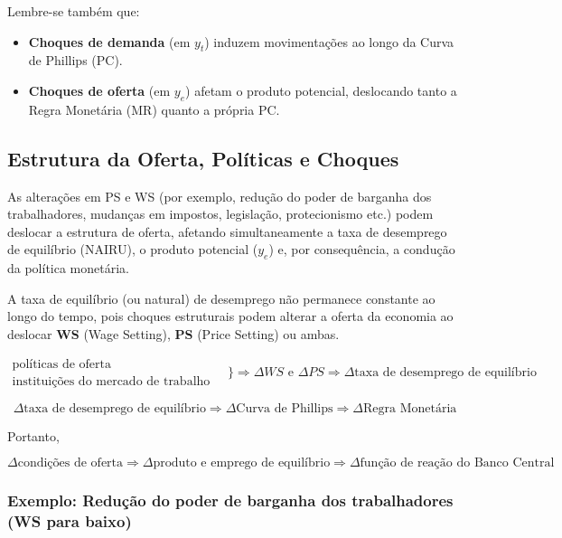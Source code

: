 \documentclass[a4paper,12pt]{article}[abntex2]
\begin{document}
Lembre-se também que:
\begin{itemize}
    \item \textbf{Choques de demanda} (em $y_t$) induzem movimentações ao longo da Curva de Phillips (PC).
    \item \textbf{Choques de oferta} (em $y_e$) afetam o produto potencial, deslocando tanto a Regra Monetária (MR) quanto a própria PC.
\end{itemize}

\subsection{\textbf{Estrutura da Oferta, Políticas e Choques}}

As alterações em PS e WS (por exemplo, redução do poder de barganha dos trabalhadores, mudanças em impostos, legislação, protecionismo etc.) podem deslocar a estrutura de oferta, afetando simultaneamente a taxa de desemprego de equilíbrio (NAIRU), o produto potencial ($y_e$) e, por consequência, a condução da política monetária.

A taxa de equilíbrio (ou natural) de desemprego não permanece constante ao longo do tempo, pois choques estruturais podem alterar a oferta da economia ao deslocar \textbf{WS} (Wage Setting), \textbf{PS} (Price Setting) ou ambas.

\[
\begin{array}{c}
\text{políticas de oferta} \\
\text{instituições do mercado de trabalho}
\end{array}
\quad
\Bigg\} 
 \Longrightarrow 
\Delta WS \text{ e } \Delta PS
 \Longrightarrow 
\Delta \text{taxa de desemprego de equilíbrio}
\]

\[
\Delta \text{taxa de desemprego de equilíbrio} 
\Longrightarrow
\Delta \text{Curva de Phillips} 
\Longrightarrow 
\Delta \text{Regra Monetária}
\]

Portanto,

\[
\Delta \text{condições de oferta} 
 \Longrightarrow 
\Delta \text{produto e emprego de equilíbrio} 
 \Longrightarrow 
\Delta \text{função de reação do Banco Central}
\]

\subsubsection{\textbf{Exemplo: Redução do poder de barganha dos trabalhadores (WS para baixo)}}
\end{document}
